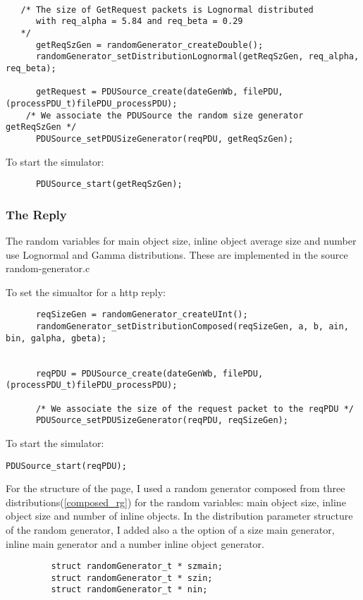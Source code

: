 \begin{verbatim}

   /* The size of GetRequest packets is Lognormal distributed 
      with req_alpha = 5.84 and req_beta = 0.29
   */    
      getReqSzGen = randomGenerator_createDouble();
      randomGenerator_setDistributionLognormal(getReqSzGen, req_alpha, req_beta);
      
      getRequest = PDUSource_create(dateGenWb, filePDU, (processPDU_t)filePDU_processPDU); 
    /* We associate the PDUSource the random size generator getReqSzGen */
      PDUSource_setPDUSizeGenerator(reqPDU, getReqSzGen);

\end{verbatim}

 To start the simulator:
\begin{verbatim}
      PDUSource_start(getReqSzGen);
\end{verbatim}

\subsubsection{The Reply} 

The random variables for main object size, inline object average size and number use Lognormal and Gamma distributions.
 These are implemented in the source random-generator.c

To set the simualtor for a http reply:

\begin{verbatim}
      reqSizeGen = randomGenerator_createUInt();
      randomGenerator_setDistributionComposed(reqSizeGen, a, b, ain, bin, galpha, gbeta);
      
 
      reqPDU = PDUSource_create(dateGenWb, filePDU, (processPDU_t)filePDU_processPDU);  
  
      /* We associate the size of the request packet to the reqPDU */
      PDUSource_setPDUSizeGenerator(reqPDU, reqSizeGen);
\end{verbatim}

 To start the simulator:
\begin{verbatim}
PDUSource_start(reqPDU);
\end{verbatim}
 
  For the structure of the page, I used a random generator composed from three distributions(\ref{composed_rg}) for the random variables: main object size, inline object size and number of inline objects.
  In the distribution parameter structure of the random generator, I added also a the option of a size main generator, inline main generator and a number inline object generator.

\begin{verbatim}
         struct randomGenerator_t * szmain;
         struct randomGenerator_t * szin;
         struct randomGenerator_t * nin;
\end{verbatim} 




